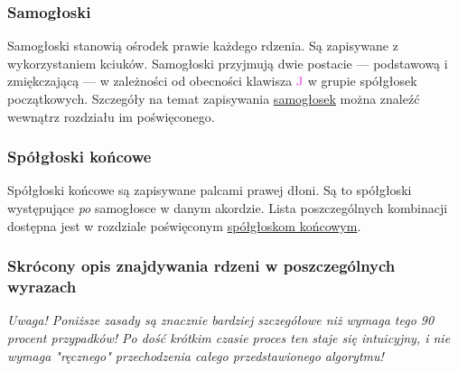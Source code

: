 \documentclass[12p, oneside]{book}
\newcommand{\steno}[1]{\textbf{\textsf{\textcolor{violet}{ #1}}}}
\begin{document}
\subsubsection{Samogłoski}
Samogłoski stanowią ośrodek prawie każdego rdzenia. Są zapisywane z
wykorzystaniem kciuków. Samogłoski przyjmują dwie postacie --- podstawową i
zmiękczającą --- w zależności od obecności klawisza \steno{J} w grupie
spółgłosek początkowych. Szczegóły na temat zapisywania
\hyperref[sec:samogloski]{samogłosek} można znaleźć wewnątrz rozdziału im
poświęconego.

\subsubsection{Spółgłoski końcowe}
Spółgłoski końcowe są zapisywane palcami prawej dłoni. Są to spółgłoski
występujące \emph{po} samogłosce w danym akordzie. Lista poszczególnych
kombinacji dostępna jest w rozdziale poświęconym
\hyperref[sec:koncowe]{spółgłoskom końcowym}.

\newpage

\subsubsection{Skrócony opis znajdywania rdzeni w poszczególnych wyrazach}

\emph{Uwaga! Poniższe zasady są znacznie bardziej szczegółowe niż wymaga tego
90 procent przypadków!
Po dość krótkim czasie proces ten staje się intuicyjny, i nie wymaga "ręcznego"
przechodzenia całego przedstawionego algorytmu!}
\end{document}
